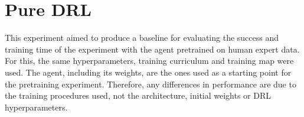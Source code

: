 \section{Pure DRL}
This experiment aimed to produce a baseline for evaluating the success and training time of the experiment with the agent pretrained on human expert data. For this, the same hyperparameters, training curriculum and training map were used. The agent, including its weights, are the ones used as a starting point for the pretraining experiment. Therefore, any differences in performance are due to the training procedures used, not the architecture, initial weights or DRL hyperparameters.
